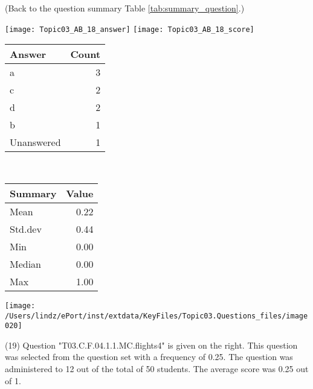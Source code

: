 \documentclass[12pt,english,nohyper]{tufte-handout}\usepackage[]{graphicx}\usepackage[]{color}
\begin{document}
 (Back to the question summary Table \ref{tab:summary_question}.)

\begin{center} \texttt{[image: Topic03\_AB\_18\_answer]} \texttt{[image: Topic03\_AB\_18\_score]} \end{center} 

\begin{center}%
\begin{tabular}{lr}
  \hline
Answer & Count \\ 
  \hline
a &   3 \\ 
  c &   2 \\ 
  d &   2 \\ 
  b &   1 \\ 
  Unanswered &   1 \\ 
   \hline
\end{tabular}
~~~~~~~~%
\begin{tabular}{lr}
  \hline
Summary & Value \\ 
  \hline
Mean & 0.22 \\ 
  Std.dev & 0.44 \\ 
  Min & 0.00 \\ 
  Median & 0.00 \\ 
  Max & 1.00 \\ 
   \hline
\end{tabular}
\end{center}\newpage{}



\vspace{4cm}\begin{marginfigure}\texttt{[image: /Users/lindz/ePort/inst/extdata/KeyFiles/Topic03.Questions\_files/image020]}\end{marginfigure}\vspace{-4cm} (19) Question "T03.C.F.04.1.1.MC.flights4" is given on the right. This question was selected from the question set with a frequency of 0.25. The question was administered to 12 out of the total of 50 students. The average score was 0.25 out of 1.
\end{document}
